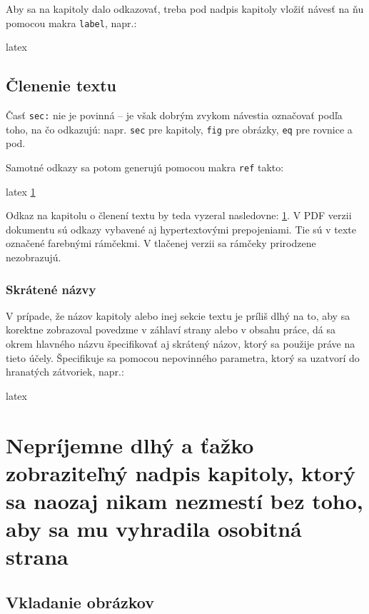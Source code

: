 Aby sa na kapitoly dalo odkazovať, treba pod nadpis kapitoly vložiť návesť na ňu pomocou makra \texttt{label}, napr.:
\begin{inlinecode}[breaklines=True]{latex}
\section{Členenie textu}
\label{sec:clenenie_textu}
\end{inlinecode}

Časť \texttt{sec:} nie je povinná -- je však dobrým zvykom návestia označovať podľa toho, na čo odkazujú: napr. \texttt{sec} pre kapitoly, \texttt{fig} pre obrázky, \texttt{eq} pre rovnice a pod.

Samotné odkazy sa potom generujú pomocou makra \texttt{ref} takto:
\begin{inlinecode}[breaklines=True]{latex}
\ref{sec:clenenie_textu}
\end{inlinecode}

Odkaz na kapitolu o členení textu by teda vyzeral nasledovne: \ref{sec:clenenie_textu}. V PDF verzii dokumentu sú odkazy vybavené aj hypertextovými prepojeniami. Tie sú v texte označené farebnými rámčekmi. V tlačenej verzii sa rámčeky prirodzene nezobrazujú.

\subsection{Skrátené názvy}

V prípade, že názov kapitoly alebo inej sekcie textu je príliš dlhý na to, aby sa korektne zobrazoval povedzme v záhlaví strany alebo v obsahu práce, dá sa okrem hlavného názvu špecifikovať aj skrátený názov, ktorý sa použije práve na tieto účely. Špecifikuje sa pomocou nepovinného parametra, ktorý sa uzatvorí do hranatých zátvoriek, napr.:
\begin{inlinecode}[breaklines=True]{latex}
\chapter[Skrátený nadpis kapitoly]{Nepríjemne dlhý a ťažko zobraziteľný nadpis kapitoly, ktorý sa naozaj nikam nezmestí bez toho, aby sa mu vyhradila osobitná strana}
\end{inlinecode}

\section{Vkladanie obrázkov}

